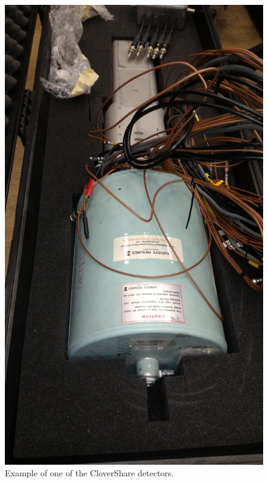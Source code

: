 \begin{figure}
    \centering
    \includegraphics[scale=0.1]{Setup_Figs/P_20160118_094821.jpg}
    \caption{Example of one of the CloverShare detectors.}
    \label{fig:clover_example}
\end{figure}